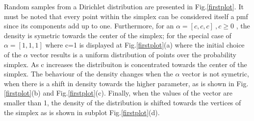 \documentclass[twoside,hidelinks]{article}
\begin{document}
Random samples from a Dirichlet distribution are presented in Fig.\ref{firstplot}. It must be noted that every point within the simplex can be considered itself a pmf since its components add up to one.  Furthermore, for an $ \alpha = [c,c,c]\ ,c \ge 0 $ , the density is symetric towards the center of the simplex; for the special case of $ \alpha = [1,1,1] $ where c=1 is displayed at Fig.\ref{firstplot}(a) where the initial choice of the $\alpha$ vector results is a uniform distribution of points over the probability simplex. As c increases the distribuiton is concentrated towards the center of the simplex. The behaviour of the density changes when the $\alpha$ vector is not symetric, when there is a shift in density towards the higher parameter, as is shown in Fig.\ref{firstplot}(b) and Fig.\ref{firstplot}(c). Finally, when the values of the vector are smaller than 1, the density of the distribution is shifted towards the vertices of the simplex as is shown in subplot Fig.\ref{firstplot}(d).
\end{document}
